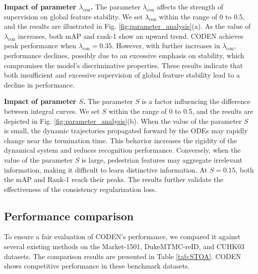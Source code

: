 \documentclass[12pt]{spieman}  %
\begin{document}
\begin{spacing}{2}
\textbf{Impact of parameter  $\lambda_{\text {con}}$.} The parameter $\lambda_{\text {con}}$ affects the strength of supervision on global feature stability. We set $\lambda_{\text {con}}$ within the range of 0 to 0.5, and the results are illustrated in Fig. \ref{fig:parameter_analysis}(a). As the value of $\lambda_{\text {con}}$ increases, both mAP and rank-1 show an upward trend. CODEN achieves peak performance when $\lambda_{\text {con}} = 0.35$. However, with further increases in $\lambda_{\text {con}}$, performance declines, possibly due to an excessive emphasis on stability, which compromises the model’s discriminative properties. These results indicate that both insufficient and excessive supervision of global feature stability lead to a decline in performance.

\textbf{Impact of parameter $S$.} The parameter $S$ is a factor influencing the difference between integral curves. We set $S$ within the range of 0 to 0.5, and the results are depicted in Fig. \ref{fig:parameter_analysis}(b). When the value of the parameter $S$ is small, the dynamic trajectories propagated forward by the ODEs may rapidly change near the termination time. This behavior increases the rigidity of the dynamical system and reduces recognition performance. Conversely, when the value of the parameter $S$ is large, pedestrian features may aggregate irrelevant information, making it difficult to learn distinctive information. At $S=0.15$, both the mAP and Rank-1 reach their peaks. The results further validate the effectiveness of the consistency regularization loss.

\subsection{Performance comparison}
To ensure a fair evaluation of CODEN's performance, we compared it against several existing methods on the Market-1501, DukeMTMC-reID, and CUHK03 datasets. The comparison results are presented in Table \ref{tab:STOA}. CODEN shows competitive performance in these benchmark datasets.


\end{spacing}
\end{document}
